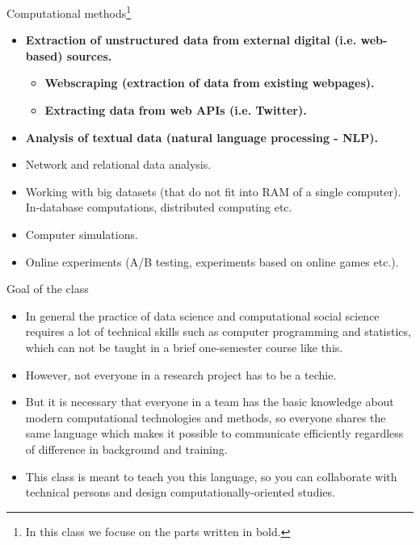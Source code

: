 \begin{frame}{Computational methods\footnote{
    In this class we focuse on the parts written in bold.
}}
\begin{itemize}
    \item \textbf{Extraction of unstructured data from external digital (i.e. web-based)
    sources.}
    \begin{itemize}
        \item \textbf{Webscraping (extraction of data from existing webpages).}
        \item \textbf{Extracting data from web APIs (i.e. Twitter).}
    \end{itemize}
    \item \textbf{Analysis of textual data (natural language processing - NLP).}
    \item Network and relational data analysis.
    \item Working with big datasets (that do not fit into RAM of a single computer).
    In-database computations, distributed computing etc.
    \item Computer simulations.
    \item Online experiments (A/B testing, experiments based on online games etc.).
\end{itemize}
\end{frame}

\begin{frame}{Goal of the class}
\begin{itemize}
    \item In general the practice of data science and computational social science
    requires a lot of technical skills such as computer programming and statistics,
    which can not be taught in a brief one-semester course like this.
    \item However, not everyone in a research project has to be a techie.
    \item But it is necessary that everyone in a team has the basic knowledge
    about modern computational technologies and methods, so everyone shares
    the same language which makes it possible to communicate efficiently regardless
    of difference in background and training.
    \item This class is meant to teach you this language, so you can
    collaborate with technical persons and design computationally-oriented
    studies.
\end{itemize}
\end{frame}

